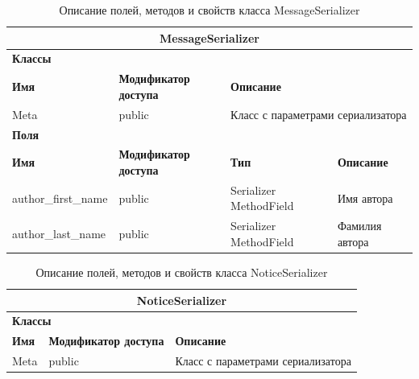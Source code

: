 \documentclass{../includes/TechDoc}
\begin{document}
    \begin{table}[ht]
        \caption{\label{tab:class-MessageSerializer-table}Описание полей, методов и свойств класса MessageSerializer}
        \centering
        \begin{tabular}{|p{3.2cm}|p{3cm}|p{2.9cm}|p{2.9cm}|p{4cm}|}
            \hline
            \multicolumn{5}{|c|}{MessageSerializer} \\ \hline
            \multicolumn{5}{|l|}{\textbf{Классы}} \\ \hline
            \textbf{Имя} & \textbf{Модификатор доступа} & \multicolumn{3}{p{9.8cm}|}{\textbf{Описание}} \\ \hline
            Meta & public & \multicolumn{3}{p{9.8cm}|}{Класс с параметрами сериализатора} \\ \hline
            \multicolumn{5}{|l|}{\textbf{Поля}} \\ \hline
            \textbf{Имя} & \textbf{Модификатор доступа} & \textbf{Тип} & \multicolumn{2}{p{6.9cm}|}{\textbf{Описание}} \\ \hline
            author_first_name & public & Serializer MethodField & \multicolumn{2}{p{6.9cm}|}{Имя автора} \\ \hline
            author_last_name & public & Serializer MethodField & \multicolumn{2}{p{6.9cm}|}{Фамилия автора} \\ \hline
        \end{tabular}
    \end{table}

    \begin{table}[ht]
        \caption{\label{tab:class-NoticeSerializer-table}Описание полей, методов и свойств класса NoticeSerializer}
        \centering
        \begin{tabular}{|p{3.2cm}|p{3cm}|p{2.9cm}|p{2.9cm}|p{4cm}|}
            \hline
            \multicolumn{5}{|c|}{NoticeSerializer} \\ \hline
            \multicolumn{5}{|l|}{\textbf{Классы}} \\ \hline
            \textbf{Имя} & \textbf{Модификатор доступа} & \multicolumn{3}{p{9.8cm}|}{\textbf{Описание}} \\ \hline
            Meta & public & \multicolumn{3}{p{9.8cm}|}{Класс с параметрами сериализатора} \\ \hline
        \end{tabular}
    \end{table}
\end{document}

